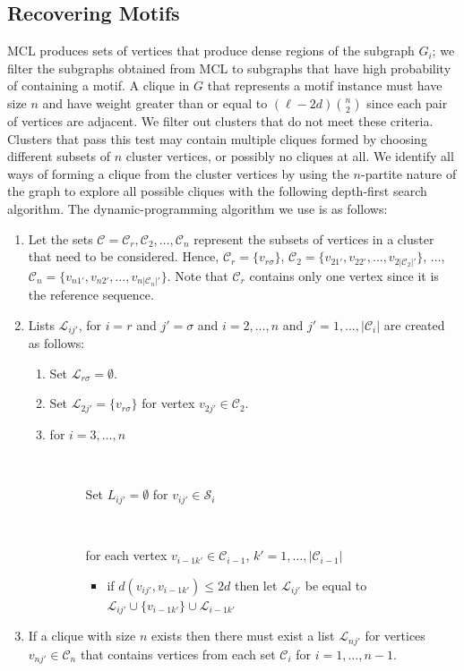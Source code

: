 \subsection{Recovering Motifs}

MCL produces sets of vertices that produce dense regions of the subgraph $G_i$; we filter the subgraphs obtained from MCL to subgraphs that have high probability of containing a motif.  A clique in $G$ that represents a motif instance must have size $n$ and have weight greater than or equal to $( \ell - 2d) {n \choose 2}$ since each pair of vertices are adjacent.  We filter out clusters that do not meet these criteria. Clusters that pass this test may contain multiple cliques formed by choosing different subsets of $n$ cluster vertices, or possibly no cliques at all. We identify all ways of forming a clique from the cluster vertices by using the $n$-partite nature of the graph to explore all possible cliques with the following depth-first search algorithm.  The dynamic-programming algorithm we use is as follows:

\begin{enumerate}
\item Let the sets $\mathcal{C} = {\mathcal{C}_r , \mathcal{C}_2, \ldots, \mathcal{C}_n}$ represent the subsets of vertices in a cluster that need to be considered.  Hence,  $\mathcal{C}_r = \{v_{r\sigma}\}$, $\mathcal{C}_2 = \{v_{21'} , v_{22'}, \ldots, v_{2|\mathcal{C}_2|'} \}$, $\ldots$, $\mathcal{C}_n = \{v_{n1'} , v_{n2'}, \ldots, v_{n|\mathcal{C}_n|'} \}$. Note that $\mathcal{C}_r$ contains only one vertex since it is the reference sequence. 
\item Lists $\mathcal{L}_{ij'}$, for $i = r$ and $j' = \sigma$ and $i = 2, \ldots, n$ and $j' = 1, \ldots, |\mathcal{C}_i|$ are created as follows: 
\begin{enumerate}
\item Set $\mathcal{L}_{r\sigma} = \emptyset$. 
\item Set $\mathcal{L}_{2j'} = \{v_{r\sigma} \}$ for vertex $v_{2j'} \in \mathcal{C}_2$. 
\item for $i = 3, \ldots, n$ 
\begin{description}
\item[~] Set $L_{ij'} = \emptyset$ for $v_{ij'} \in \mathcal{S}_i$
\item[~] for each vertex $v_{i -1k'} \in \mathcal{C}_{i−1}$, $k' = 1, \ldots, |\mathcal{C}_{i−1}|$
\begin{itemize}
\item if $d(v_{ij'}, v_{i-1k'} ) \leq 2d$ then let $\mathcal{L}_{ij'}$ be equal to $\mathcal{L}_{ij'} \cup \{ v_{i-1k′} \} \cup \mathcal{L}_{i-1k'}$
\end{itemize} 
\end{description}
\end{enumerate}
\item If a clique with size $n$ exists then there must exist a list $\mathcal{L}_{nj'}$ for vertices $v_{nj'} \in \mathcal{C}_n$ that contains vertices from each set $\mathcal{C}_i$ for $i = 1, \ldots, n -1$. 
\end{enumerate}

